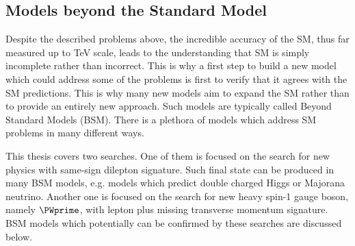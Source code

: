
\subsection{Models beyond the Standard Model}
\label{subsec:bsm_models}
Despite the described problems above, the incredible accuracy of the SM, thus far measured up to TeV scale, leads to the understanding that SM 
is simply incomplete rather than incorrect. 
This is why a first step to build a new model which could address some of the problems is first to verify that it agrees with the SM predictions. 
This is why many new models aim to expand the SM rather than to provide an entirely new approach. Such models are typically called Beyond Standard Models (BSM).
There is a plethora of models which address SM problems in many different ways. 

This thesis covers two searches. One of them is focused on the search for new physics with same-sign dilepton signature. Such final state can be produced in many BSM models, e.g. models which predict double charged Higgs or Majorana neutrino. Another one is focused on the search for new heavy spin-1 gauge boson, namely $\PWprime$, with lepton plus missing transverse momentum signature. BSM models which potentially can be confirmed by these searches are discussed below.

